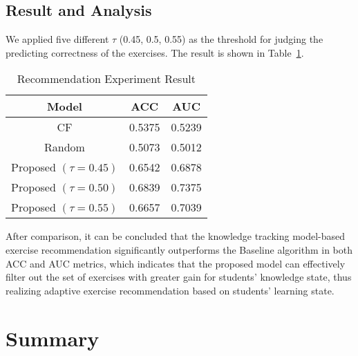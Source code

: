 \subsection{Result and Analysis}
We applied five different \(\tau \) (0.45, 0.5, 0.55) as the threshold for judging the predicting correctness of the exercises. The result is shown in Table~\ref{table:ch4-exp-result}.
\begin{table}[htbp]
  \caption{Recommendation Experiment Result}\label{table:ch4-exp-result}
  \centering
  \begin{tabular}{c c c}
    \toprule
    Model                    & ACC    & AUC    \\
    \midrule
    CF                       & 0.5375 & 0.5239 \\
    Random                   & 0.5073 & 0.5012 \\
    \midrule
    Proposed \((\tau=0.45)\) & 0.6542 & 0.6878 \\
    Proposed \((\tau=0.50)\) & 0.6839 & 0.7375 \\
    Proposed \((\tau=0.55)\) & 0.6657 & 0.7039 \\
    \bottomrule
  \end{tabular}
\end{table}
After comparison, it can be concluded that the knowledge tracking model-based exercise recommendation significantly outperforms the Baseline algorithm in both ACC and AUC metrics, which indicates that the proposed model can effectively filter out the set of exercises with greater gain for students' knowledge state, thus realizing adaptive exercise recommendation based on students' learning state.

\section{Summary}

